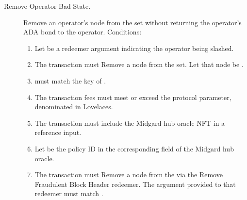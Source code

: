 \documentclass[../midgard.tex]{subfiles}
\begin{document}
\begin{description}
    \item[Remove Operator Bad State.] Remove an operator's node from the  set without returning the operator's ADA bond to the operator.
      Conditions:
        \begin{enumerate}
            \item Let  be a redeemer argument indicating the operator being slashed.
            \item The transaction must Remove a node from the  set.
              Let that node be .
            \item {} must match the key of .
            \item The transaction fees must meet or exceed the  protocol parameter, denominated in Lovelaces.
            \item The transaction must include the Midgard hub oracle NFT in a reference input.
            \item Let  be the policy ID in the corresponding field of the Midgard hub oracle.
            \item The transaction must Remove a node from the  via the Remove Fraudulent Block Header redeemer.
              The  argument provided to that redeemer must match .
        \end{enumerate}


\end{description}
\end{document}
